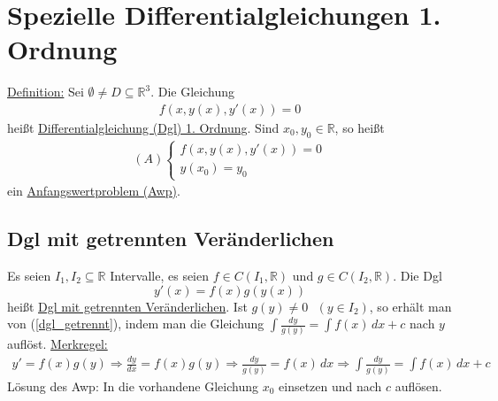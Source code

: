 \section{Spezielle Differentialgleichungen 1. Ordnung}
\underline{Definition:} Sei $\emptyset \neq D \subseteq \mathbb{R}^3$. Die Gleichung
\begin{align*}
    f(x,y(x),y'(x)) = 0
\end{align*}
heißt \underline{Differentialgleichung (Dgl) 1. Ordnung}. Sind $x_0,y_0 \in \mathbb{R}$, so heißt
\begin{align*}
    (A) \begin{cases}
    f(x,y(x),y'(x)) = 0 \\
    y(x_0) = y_0
    \end{cases}
\end{align*}
ein \underline{Anfangswertproblem (Awp)}.

\subsection{Dgl mit getrennten Veränderlichen}
Es seien $I_1, I_2 \subseteq \mathbb{R}$ Intervalle, es seien $f \in C(I_1,\mathbb{R})$ und $g \in C(I_2,\mathbb{R})$. Die Dgl
\begin{equation} \label{dgl_getrennt}
    y'(x) = f(x)g(y(x))
\end{equation}
heißt \underline{Dgl mit getrennten Veränderlichen}. Ist $g(y) \neq 0 \text{ } (y \in I_2)$, so erhält man von (\ref{dgl_getrennt}), indem man die Gleichung
$\int \frac{dy}{g(y)} = \int f(x)\,dx + c$ nach $y$ auflöst.
\underline{Merkregel:}
\begin{align*}
    y' = f(x)g(y) \Rightarrow \frac{dy}{dx} = f(x)g(y) \Rightarrow \frac{dy}{g(y)} = f(x)\,dx \Rightarrow \int \frac{dy}{g(y)} = \int f(x)\,dx + c
\end{align*}
Lösung des Awp: In die vorhandene Gleichung $x_0$ einsetzen und nach $c$ auflösen.

